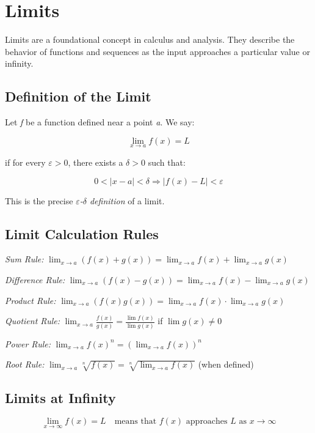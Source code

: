 \newpage
\section{Limits}

Limits are a foundational concept in calculus and analysis. They describe the behavior of 
functions and sequences as the input approaches a particular value or infinity.

\subsection{Definition of the Limit}

Let \emph{f} be a function defined near a point \emph{a}. We say:

\[
    \lim_{x \to a} f(x) = L
\]

if for every \(\varepsilon > 0\), there exists a \(\delta > 0\) such that:

\[
    0 < |x - a| < \delta \Rightarrow |f(x) - L| < \varepsilon
\]

This is the precise \emph{\(\varepsilon\)-\(\delta\) definition} of a limit.

\subsection{Limit Calculation Rules}

\emph{Sum Rule:} \(\displaystyle \lim_{x \to a} (f(x) + g(x)) = \lim_{x \to a} f(x) + \lim_{x \to a} g(x)\)

\emph{Difference Rule:} \(\displaystyle \lim_{x \to a} (f(x) - g(x)) = \lim_{x \to a} f(x) - \lim_{x \to a} g(x)\)

\emph{Product Rule:} \(\displaystyle \lim_{x \to a} (f(x)g(x)) = \lim_{x \to a} f(x) \cdot \lim_{x \to a} g(x)\)

\emph{Quotient Rule:} \(\displaystyle \lim_{x \to a} \frac{f(x)}{g(x)} = \frac{\lim f(x)}{\lim g(x)}\) if \(\lim g(x) \ne 0\)

\emph{Power Rule:} \(\displaystyle \lim_{x \to a} {f(x)}^n = {(\lim_{x \to a} f(x))}^n\)

\emph{Root Rule:} \(\displaystyle \lim_{x \to a} \sqrt[n]{f(x)} = \sqrt[n]{\lim_{x \to a} f(x)}\) (when defined)

\subsection{Limits at Infinity}

\[
    \lim_{x \to \infty} f(x) = L \quad \text{means that } f(x) \text{ approaches } L \text{ as } x \to \infty
\]

